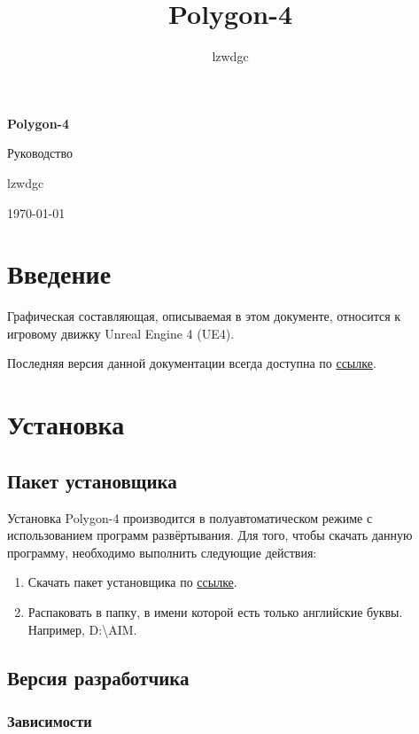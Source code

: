 \documentclass[a4paper,12pt]{report}
\author{lzwdgc}
\title{Polygon-4}
\newcommand{\ue}{UE4\xspace}
\newcommand{\pf}{Polygon-4\xspace}
\begin{document}
\large %

\begin{titlepage}
\centering
\vspace*{7cm}
{\huge\bfseries Polygon-4\par}
\vspace{1.5cm}
{\Large Руководство\par}
\vspace{1.5cm}
lzwdgc
\vfill
{\today\par}
\end{titlepage}
\setcounter{page}{2}
\tableofcontents

\chapter*{Введение}

Графическая составляющая, описываемая в этом документе, относится к игровому движку Unreal Engine 4 (\ue).

Последняя версия данной документации всегда доступна по \href{https://www.dropbox.com/s/ipnakg5civ0xp0g/Polygon4_ru.pdf?dl=1}{ссылке}.

\chapter{Установка}

\section{Пакет установщика}

Установка \pf производится в полуавтоматическом режиме с использованием программ развёртывания.
Для того, чтобы скачать данную программу, необходимо выполнить следующие действия:

\begin{enumerate}
\item Скачать пакет установщика по \href{https://www.dropbox.com/s/0zhbgb1ftspcv9w/polygon4.zip?dl=1}{ссылке}.
\item Распаковать в папку, в имени которой есть только английские буквы. Например, D:\backslash AIM.
\end{enumerate}


\section{Версия разработчика}

\subsection{Зависимости}
\end{document}
